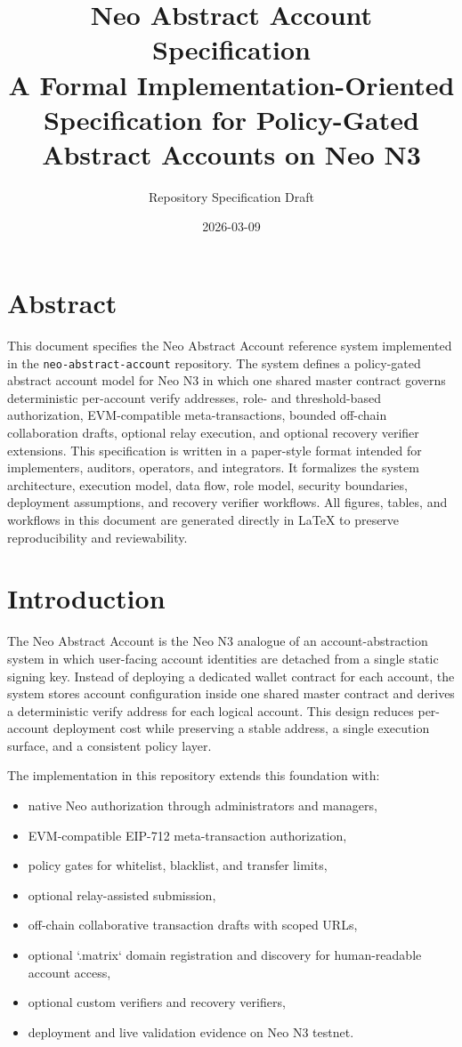 \documentclass[11pt]{article}
\title{\textbf{Neo Abstract Account Specification}\\
\large A Formal Implementation-Oriented Specification for Policy-Gated Abstract Accounts on Neo N3}
\author{Repository Specification Draft}
\date{2026-03-09}
\newcommand{\code}[1]{\texttt{#1}}
\newcommand{\aasystem}{Neo Abstract Account}
\begin{document}
\maketitle
\tableofcontents
\newpage

\section{Abstract}
This document specifies the \aasystem{} reference system implemented in the \code{neo-abstract-account} repository. The system defines a policy-gated abstract account model for Neo N3 in which one shared master contract governs deterministic per-account verify addresses, role- and threshold-based authorization, EVM-compatible meta-transactions, bounded off-chain collaboration drafts, optional relay execution, and optional recovery verifier extensions. This specification is written in a paper-style format intended for implementers, auditors, operators, and integrators. It formalizes the system architecture, execution model, data flow, role model, security boundaries, deployment assumptions, and recovery verifier workflows. All figures, tables, and workflows in this document are generated directly in LaTeX to preserve reproducibility and reviewability.

\section{Introduction}
The \aasystem{} is the Neo N3 analogue of an account-abstraction system in which user-facing account identities are detached from a single static signing key. Instead of deploying a dedicated wallet contract for each account, the system stores account configuration inside one shared master contract and derives a deterministic verify address for each logical account. This design reduces per-account deployment cost while preserving a stable address, a single execution surface, and a consistent policy layer.

The implementation in this repository extends this foundation with:
\begin{itemize}
  \item native Neo authorization through administrators and managers,
  \item EVM-compatible EIP-712 meta-transaction authorization,
  \item policy gates for whitelist, blacklist, and transfer limits,
  \item optional relay-assisted submission,
  \item off-chain collaborative transaction drafts with scoped URLs,\n  \item optional `.matrix` domain registration and discovery for human-readable account access,\n  \item optional custom verifiers and recovery verifiers,
  \item deployment and live validation evidence on Neo N3 testnet.
\end{itemize}
\end{document}
